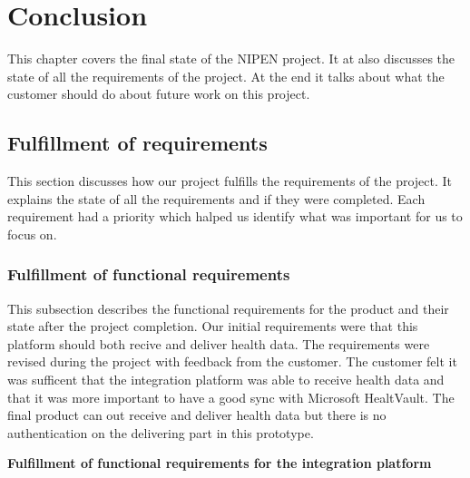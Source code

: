 \chapter{Conclusion}
\label{ch:conclusion}

This chapter covers the final state of the NIPEN project.
It at also discusses the state of all the requirements of the project.
At the end it talks about what the customer should do about future work on this project.

\section{Fulfillment of requirements}

This section discusses how our project fulfills the requirements of the project. 
It explains the state of all the requirements and if they were completed. Each requirement had a priority which halped us identify what was important for us to focus on.

\subsection{Fulfillment of functional requirements}

This subsection describes the functional requirements for the product and their state after the project completion.
Our initial requirements were that this platform should both recive and deliver health data. 
The requirements were revised during the project with feedback from the customer.
The customer felt it was sufficent that the integration platform was able to receive health data and that it was more important to have a good sync with Microsoft HealtVault. 
The final product can out receive and deliver health data but there is no authentication on the delivering part in this prototype. 

\textbf{Fulfillment of functional requirements for the integration platform}

